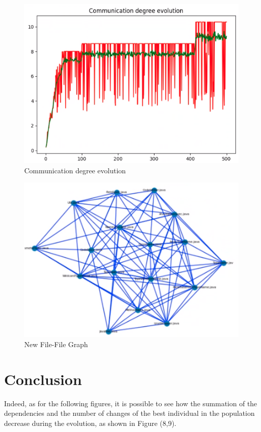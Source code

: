 \documentclass[sigconf]{acmart}
\begin{document}
\begin{figure}[h]
  \centering
  \includegraphics[width=\linewidth]{img_13}
  \caption{Communication degree evolution}
  \Description{}
\end{figure}

\begin{figure}[h]
  \centering
  \includegraphics[width=\linewidth]{img_14}
  \caption{New File-File Graph}
  \Description{}
\end{figure}

\section{Conclusion}
Indeed, as for the following figures, it is possible to see how the summation of the dependencies and the number of changes of the best individual in the population decrease during the evolution, as shown in Figure (8,9).
\end{document}
